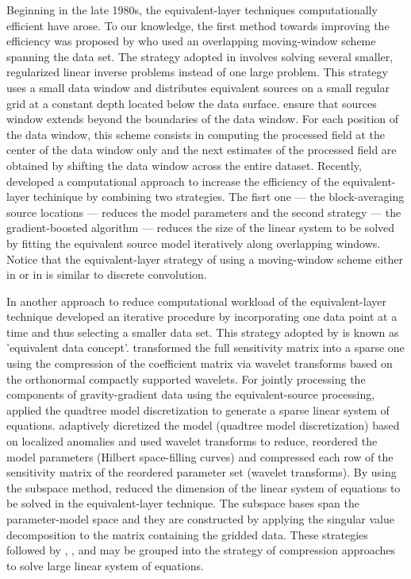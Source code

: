 Beginning in the late 1980s, the equivalent-layer techniques computationally efficient have arose. 
To our knowledge, the first method towards improving the efficiency  was proposed by \cite{leao-silva1989} who used an overlapping moving-window scheme spanning the data set. The strategy adopted in \cite{leao-silva1989} involves solving several smaller, regularized linear inverse problems instead of one large problem. This strategy uses a small data window and distributes equivalent sources on a small regular grid at a constant depth located below the data surface.
\cite{leao-silva1989} ensure that sources window extends beyond the boundaries of the data window.
For each position of the data window, this scheme consists in computing the processed field 
at the center of the data window only and the next estimates of the processed field are 
obtained by shifting the data window across the entire dataset. Recently, \cite{soler-uieda2021} developed a computational approach to increase the efficiency of the equivalent-layer techinique by combining two strategies. The fisrt one --- the block-averaging source locations --- reduces the model parameters and the second strategy --- the gradient-boosted algorithm --- reduces the size of the linear system to be solved by fitting the equivalent source model iteratively along overlapping windows. Notice that the equivalent-layer strategy of using a moving-window scheme either in \cite{leao-silva1989} or in \cite{soler-uieda2021} is similar to discrete convolution.

In another approach to reduce computational workload of the equivalent-layer technique \cite{mendonca-silva1994} developed an iterative procedure by incorporating one data point at a time and thus selecting a smaller data set. This strategy adopted by \cite{mendonca-silva1994} is known as 'equivalent data concept'. \cite{li-oldenburg2010} transformed the full sensitivity matrix into a sparse one using the compression of the coefficient matrix via wavelet transforms based on the orthonormal compactly supported wavelets. For jointly processing the components of gravity-gradient data using the equivalent-source processing, \cite{barnes-lumley2011} applied the quadtree model discretization to generate a sparse linear system of equations. \cite{davis_li2011} adaptively dicretized the model (quadtree model discretization) based on localized anomalies and used wavelet transforms to reduce, reordered the model parameters (Hilbert space-filling curves) and compressed each row of the sensitivity matrix of the reordered parameter set (wavelet transforms). By using the subspace method, \cite{mendoncca2020} reduced the dimension of the linear system of equations to be solved in the equivalent-layer technique. The subspace bases span the parameter-model space and they are constructed by applying the singular value decomposition to the matrix containing the gridded data. These strategies followed by \cite{li-oldenburg2010}, \cite{barnes-lumley2011}, \cite{davis_li2011} and \cite{mendoncca2020} may be grouped into the strategy of compression approaches to solve large linear system of equations.

